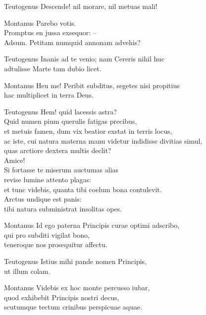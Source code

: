 \documentclass{ees}
\begin{document}
{\begin{lyrics}
  \item[Teutogenus]
  Descende! nil morare, nil metuas mali!

  \item[Montanus]
  Parebo votis.\\
  Promptus en jussa exsequor: –\\
  Adsum. Petitam numquid annonam advehis?

  \item[Teutogenus]
  Inanis ad te venio; nam Cereris nihil huc\\
  adtulisse Marte tam dubio licet.

  \item[Montanus]
  Heu me! Peribit subditus, segetes nisi propitius\\
  hac multiplicet in terra Deus.

  \item[Teutogenus]
  Hem! quid lacessis astra?\\
  Quid numen pium querulis fatigas precibus,\\
  et metuis famen, dum vix beatior exstat in terris locus,\\
  ac iste, cui natura materna manu videtur indidisse divitias simul,\\
  quas arctiore dextera multis declit?\\
  Amice!\\
  Si fortasse te miserum auctumas alias\\
  revise lumine attento plagas:\\
  et tunc videbis, quanta tibi coelum bona contulevit.\\
  Arctus undique est panis:\\
  tibi natura subministrat insolitas opes.

  \item[Montanus]
  Id ego paterna Principis curae optimi adscribo,\\
  qui pro subditi vigilat bono,\\
  teneroque nos prosequitur affectu.

  \item[Teutogenus]
  Istius mihi pande nomen Principis,\\
  ut illum colam.

  \item[Montanus]
  Videbis ex hoc monte percusso iubar,\\
  quod exhibebit Principis nostri decus,\\
  scutumque tectum crinibus perspicuae aquae.


\end{lyrics}}
\end{document}
